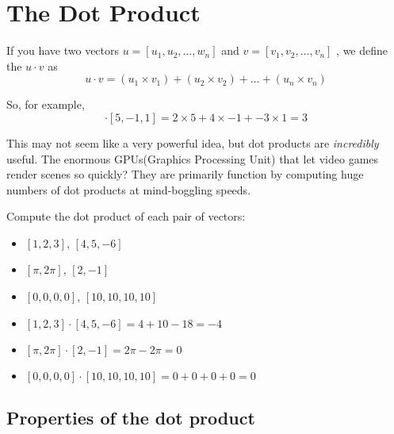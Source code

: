 \chapter{The Dot Product}

If you have two vectors $u = [u_1, u_2, \dots, w_n]$ and $v = [v_1, v_2,\dots, v_n]$ , 
we define the  $u \cdot v$ as 
\begin{equation*}
     u \cdot v = (u_1 \times v_1) + (u_2 \times v_2) + \dots + (u_n \times v_n)
\end{equation*} 

So, for example, 
\begin{equation*}
    [2,4, -3] \cdot [5, -1, 1] = 2 \times 5 + 4 \times -1 + -3 \times 1 = 3
\end{equation*}

This may not seem like a very powerful idea, but dot products are \emph{incredibly} useful. 
The enormous GPUs(Graphics Processing Unit) that let video games render scenes so quickly? 
They are primarily function by computing huge numbers of dot products at mind-boggling speeds. 

\begin{Exercise}[title={Basic dot products}, label=dot_products]
    Compute the dot product of each pair of vectors:
    \begin{itemize}
        \item $[1, 2, 3]$, $[4, 5, -6]$
        \item $[\pi, 2\pi]$, $[2, -1]$
        \item $[0,0,0,0]$, $[10,10,10,10]$
    \end{itemize}
\end{Exercise}
\begin{Answer}[ref=dot_products]
        \begin{itemize}
            \item $[1, 2, 3] \cdot [4, 5, -6] = 4 + 10 - 18 = -4$
            \item $[\pi, 2\pi] \cdot [2, -1] = 2\pi - 2\pi = 0$
            \item $[0,0,0,0] \cdot [10,10,10,10] = 0 + 0 + 0 + 0 = 0$ 
        \end{itemize}
\end{Answer}

\section{Properties of the dot product}

